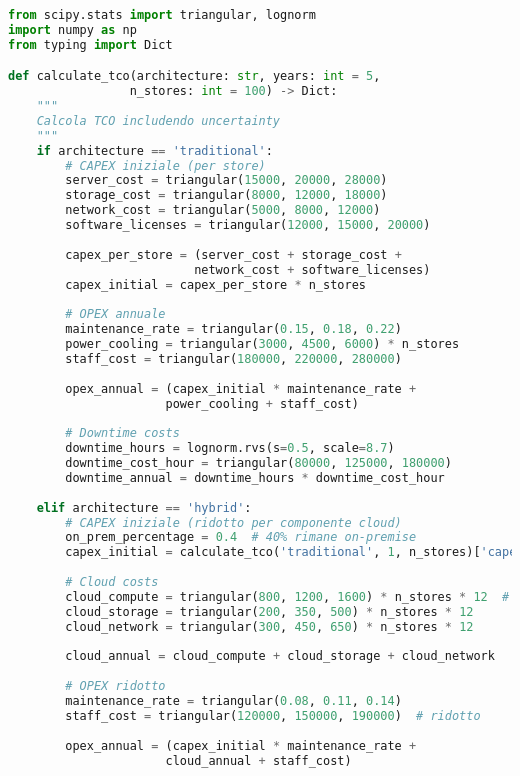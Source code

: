 \begin{lstlisting}[language=Python, caption=Calcolo TCO per Architetture Alternative]
from scipy.stats import triangular, lognorm
import numpy as np
from typing import Dict

def calculate_tco(architecture: str, years: int = 5, 
                 n_stores: int = 100) -> Dict:
    """
    Calcola TCO includendo uncertainty
    """
    if architecture == 'traditional':
        # CAPEX iniziale (per store)
        server_cost = triangular(15000, 20000, 28000)
        storage_cost = triangular(8000, 12000, 18000)
        network_cost = triangular(5000, 8000, 12000)
        software_licenses = triangular(12000, 15000, 20000)
        
        capex_per_store = (server_cost + storage_cost + 
                          network_cost + software_licenses)
        capex_initial = capex_per_store * n_stores
        
        # OPEX annuale
        maintenance_rate = triangular(0.15, 0.18, 0.22)
        power_cooling = triangular(3000, 4500, 6000) * n_stores
        staff_cost = triangular(180000, 220000, 280000)
        
        opex_annual = (capex_initial * maintenance_rate + 
                      power_cooling + staff_cost)
        
        # Downtime costs
        downtime_hours = lognorm.rvs(s=0.5, scale=8.7)
        downtime_cost_hour = triangular(80000, 125000, 180000)
        downtime_annual = downtime_hours * downtime_cost_hour
        
    elif architecture == 'hybrid':
        # CAPEX iniziale (ridotto per componente cloud)
        on_prem_percentage = 0.4  # 40% rimane on-premise
        capex_initial = calculate_tco('traditional', 1, n_stores)['capex'] * on_prem_percentage
        
        # Cloud costs
        cloud_compute = triangular(800, 1200, 1600) * n_stores * 12  # mensile
        cloud_storage = triangular(200, 350, 500) * n_stores * 12
        cloud_network = triangular(300, 450, 650) * n_stores * 12
        
        cloud_annual = cloud_compute + cloud_storage + cloud_network
        
        # OPEX ridotto
        maintenance_rate = triangular(0.08, 0.11, 0.14)
        staff_cost = triangular(120000, 150000, 190000)  # ridotto
        
        opex_annual = (capex_initial * maintenance_rate + 
                      cloud_annual + staff_cost)
        

\end{lstlisting}
